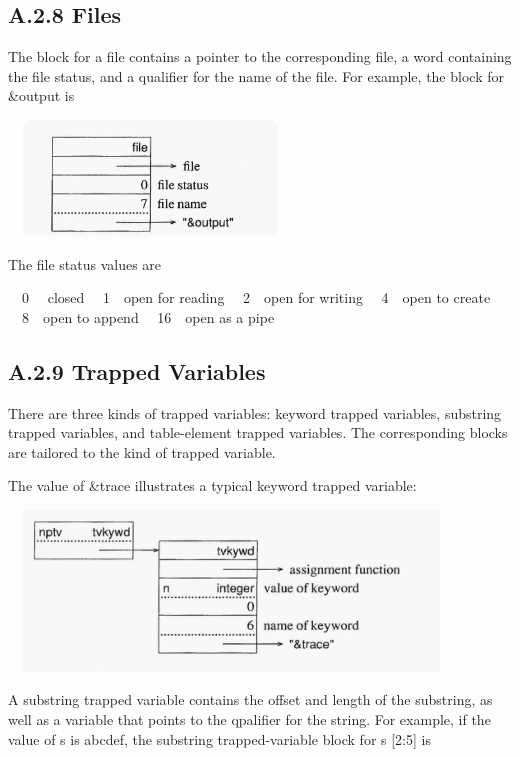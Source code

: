 \subsection{A.2.8 Files}

The block for a file contains a pointer to the corresponding file, a
word containing the file status, and a qualifier for the name of the
file. For example, the block for \&output is


\ \  \includegraphics[width=2.6717in,height=1.2083in]{ib-img/ib-img126.jpg} 


The file status values are


\ \ 0 \ \ closed\newline
\ \ 1\ \ open for reading\newline
\ \ 2\ \ open for writing\newline
\ \ 4\ \ open to create\newline
\ \ 8\ \ open to append\newline
\ \ 16\ \ open as a pipe

\subsection{A.2.9 Trapped Variables}

There are three kinds of trapped variables: keyword trapped variables,
substring trapped variables, and table-element trapped variables. The
corresponding blocks are tailored to the kind of trapped variable.


The value of \&trace illustrates a typical keyword trapped variable:


\ \  \includegraphics[width=4.3811in,height=1.6862in]{ib-img/ib-img127.jpg} 


A substring trapped variable contains the offset and length of the
substring, as well as a variable that points to the qpalifier for the
string. For example, if the value of s is
{\textquotedbl}abcdef{\textquotedbl}, the substring trapped-variable
block for s [2:5] is


